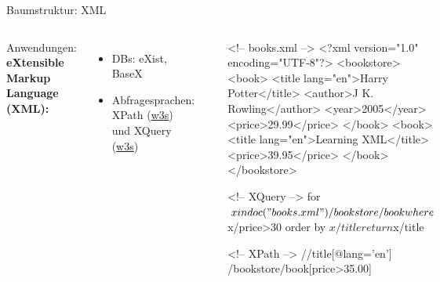 \begin{frame}[fragile]{Baumstruktur: XML}
  \begin{columns}[T,onlytextwidth]
    Anwendungen: \textbf{eXtensible Markup Language (XML):}
          \begin{itemize}\footnotesize
              \item DBs: eXist, BaseX 
              \item Abfragesprachen: 
              XPath (\href{https://www.w3schools.com/xml/xpath_intro.asp}{w3s}) und XQuery (\href{https://www.w3schools.com/xml/xquery_example.asp}{w3s})
          \end{itemize}
          \bigskip

      \begin{block}{}
        \includegraphics[width=0.95\textwidth]{img/baumstruktur.png}
      \end{block}

\begin{xmlcode}
<!-- books.xml -->
<?xml version="1.0" encoding="UTF-8"?>
<bookstore>
  <book>
    <title lang="en">Harry Potter</title>
    <author>J K. Rowling</author>
    <year>2005</year>
    <price>29.99</price>
  </book>
  <book>
    <title lang="en">Learning XML</title>
    <price>39.95</price>
  </book>
</bookstore>

<!-- XQuery -->
for $x in doc("books.xml")/bookstore/book
where $x/price>30
order by $x/title
return $x/title

<!-- XPath -->
//title[@lang='en']
/bookstore/book[price>35.00]
\end{xmlcode}

  \end{columns}
\end{frame}


